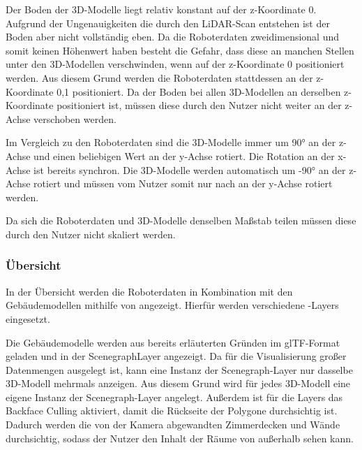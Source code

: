 Der Boden der 3D-Modelle liegt relativ konstant auf der z-Koordinate 0. Aufgrund der Ungenauigkeiten die durch den \ac{LiDAR}-Scan entstehen ist der Boden aber nicht vollständig eben. Da die Roboterdaten zweidimensional und somit keinen Höhenwert haben besteht die Gefahr, dass diese an manchen Stellen unter den 3D-Modellen verschwinden, wenn auf der z-Koordinate 0 positioniert werden. Aus diesem Grund werden die Roboterdaten stattdessen an der z-Koordinate 0,1 positioniert. Da der Boden bei allen 3D-Modellen an derselben z-Koordinate positioniert ist, müssen diese durch den Nutzer nicht weiter an der z-Achse verschoben werden.

Im Vergleich zu den Roboterdaten sind die 3D-Modelle immer um 90° an der z-Achse und einen beliebigen Wert an der y-Achse rotiert. Die Rotation an der x-Achse ist bereits synchron. Die 3D-Modelle werden automatisch um -90° an der z-Achse rotiert und müssen vom Nutzer somit nur nach an der y-Achse rotiert werden.

Da sich die Roboterdaten und 3D-Modelle denselben Maßstab teilen müssen diese durch den Nutzer nicht skaliert werden.

\subsubsection{Übersicht}
In der Übersicht werden die Roboterdaten in Kombination mit den Gebäudemodellen mithilfe von \deckgl{}  angezeigt. Hierfür werden verschiedene \deckgl{}-Layers eingesetzt.

Die Gebäudemodelle werden aus bereits erläuterten Gründen im \ac{glTF}-Format geladen und in der ScenegraphLayer angezeigt. Da \deckgl{} für die Visualisierung großer Datenmengen ausgelegt ist, kann eine Instanz der Scenegraph-Layer nur dasselbe 3D-Modell mehrmals anzeigen. Aus diesem Grund wird für jedes 3D-Modell eine eigene Instanz der Scenegraph-Layer angelegt.
Außerdem ist für die Layers das Backface Culling aktiviert, damit die Rückseite der Polygone durchsichtig ist.
Dadurch werden die von der Kamera abgewandten Zimmerdecken und Wände durchsichtig, sodass der Nutzer den Inhalt der Räume von außerhalb sehen kann.

